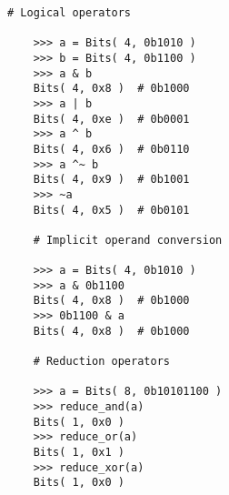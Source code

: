 

  \begin{lstlisting}[gobble=4]
    # Logical operators

    >>> a = Bits( 4, 0b1010 )
    >>> b = Bits( 4, 0b1100 )
    >>> a & b
    Bits( 4, 0x8 )  # 0b1000
    >>> a | b
    Bits( 4, 0xe )  # 0b0001
    >>> a ^ b
    Bits( 4, 0x6 )  # 0b0110
    >>> a ^~ b
    Bits( 4, 0x9 )  # 0b1001
    >>> ~a
    Bits( 4, 0x5 )  # 0b0101

    # Implicit operand conversion

    >>> a = Bits( 4, 0b1010 )
    >>> a & 0b1100
    Bits( 4, 0x8 )  # 0b1000
    >>> 0b1100 & a
    Bits( 4, 0x8 )  # 0b1000

    # Reduction operators

    >>> a = Bits( 8, 0b10101100 )
    >>> reduce_and(a)
    Bits( 1, 0x0 )
    >>> reduce_or(a)
    Bits( 1, 0x1 )
    >>> reduce_xor(a)
    Bits( 1, 0x0 )
  \end{lstlisting}

  \captionsetup{justification=centering}
  \label{code-tut3-basics-bits-ops1}

